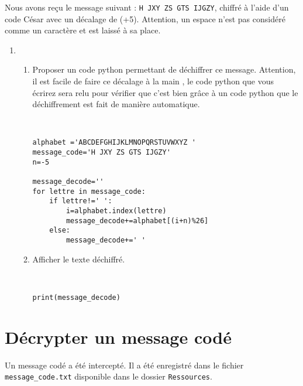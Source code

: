 Nous avons reçu le message suivant : \texttt{H JXY ZS GTS IJGZY}, chiffré à l'aide d'un code César avec un décalage de (+5). Attention, un espace n'est pas considéré comme un caractère et est laissé à sa place.

\begin{enumerate}
\item \begin{enumerate}
\item Proposer un code python permettant de déchiffrer ce message. Attention, il est facile de faire ce décalage \og à la main \fg, le code python que vous écrirez sera relu pour vérifier que c'est bien grâce à un code python que le déchiffrement est fait de manière automatique.
 \begin{solution}~\ \\
\begin{verbatim}
alphabet ='ABCDEFGHIJKLMNOPQRSTUVWXYZ '
message_code='H JXY ZS GTS IJGZY'
n=-5

message_decode=''
for lettre in message_code:
    if lettre!=' ':
        i=alphabet.index(lettre)
        message_decode+=alphabet[(i+n)%26]
    else:
        message_decode+=' '
\end{verbatim}
\end{solution}
\item Afficher le texte déchiffré.
\begin{solution}~\ \\
\begin{verbatim}
print(message_decode)
\end{verbatim}
\end{solution}
\end{enumerate}
\end{enumerate}

\section*{Décrypter un message codé}
Un message codé a été intercepté. Il a été enregistré dans le fichier \verb?message_code.txt? disponible dans le dossier \verb?Ressources?.

